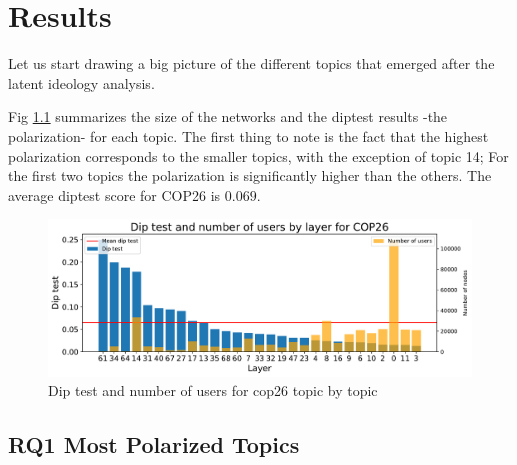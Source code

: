 \chapter{Results}%
\label{ch:res}
Let us start drawing a big picture of the different topics that emerged after the latent ideology analysis. 


Fig \ref{fig:diptest} summarizes the size of the networks and the diptest results -the polarization- for each topic. The first thing to note is the fact that  the highest polarization corresponds to the smaller topics, with the exception of topic 14; For the first two topics the polarization is significantly higher than the others. The average diptest score for COP26 is $0.069$.


\begin{figure}[H]
    \centering
    \includegraphics[width=0.95\linewidth]{Chapter5//figures/dip_test_cop26.pdf}
    \caption{Dip test and number of users for cop26 topic by topic}
    \label{fig:diptest}
\end{figure}

\section{RQ1 Most Polarized Topics}



